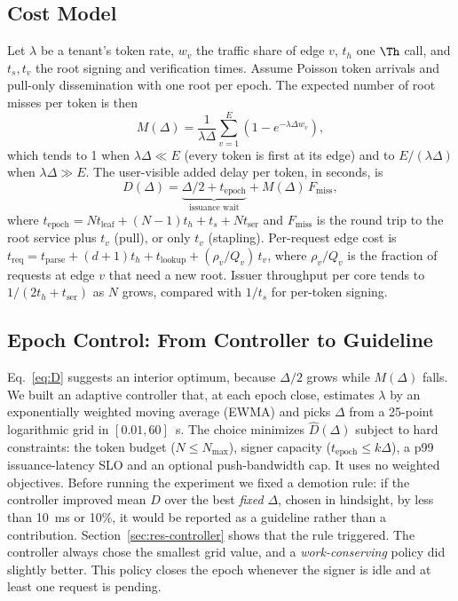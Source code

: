 \subsection{Cost Model}
Let $\lambda$ be a tenant's token rate, $w_v$ the traffic share of edge $v$, $t_h$ one $\Th$ call, and $t_s,t_v$ the root signing and verification times. Assume Poisson token arrivals and pull-only dissemination with one root per epoch. The expected number of root misses per token is then
\begin{equation}
M(\Delta)=\frac{1}{\lambda\Delta}\sum_{v=1}^{E}\left(1-e^{-\lambda\Delta w_v}\right),
\label{eq:miss}
\end{equation}
which tends to 1 when $\lambda\Delta\ll E$ (every token is first at its edge) and to $E/(\lambda\Delta)$ when $\lambda\Delta\gg E$. The user-visible added delay per token, in seconds, is
\begin{equation}
D(\Delta)=\underbrace{\Delta/2+t_{\text{epoch}}}_{\text{issuance wait}}+M(\Delta)\,F_{\text{miss}},
\label{eq:D}
\end{equation}
where $t_{\text{epoch}}=N t_{\text{leaf}}+(N-1)t_h+t_s+N t_{\text{ser}}$ and $F_{\text{miss}}$ is the round trip to the root service plus $t_v$ (pull), or only $t_v$ (stapling). Per-request edge cost is $t_{\text{req}}=t_{\text{parse}}+(d+1)t_h+t_{\text{lookup}}+(\rho_v/Q_v)\,t_v$, where $\rho_v/Q_v$ is the fraction of requests at edge $v$ that need a new root. Issuer throughput per core tends to $1/(2t_h+t_{\text{ser}})$ as $N$ grows, compared with $1/t_s$ for per-token signing.

\subsection{Epoch Control: From Controller to Guideline}
\label{sec:controller}
Eq.~\eqref{eq:D} suggests an interior optimum, because $\Delta/2$ grows while $M(\Delta)$ falls. We built an adaptive controller that, at each epoch close, estimates $\lambda$ by an exponentially weighted moving average (EWMA) and picks $\Delta$ from a 25-point logarithmic grid in $[0.01,60]$~s. The choice minimizes $\hat D(\Delta)$ subject to hard constraints: the token budget ($N\le N_{\max}$), signer capacity ($t_{\text{epoch}}\le k\Delta$), a p99 issuance-latency SLO and an optional push-bandwidth cap. It uses no weighted objectives. Before running the experiment we fixed a demotion rule: if the controller improved mean $D$ over the best \emph{fixed} $\Delta$, chosen in hindsight, by less than 10~ms or 10\%, it would be reported as a guideline rather than a contribution. Section~\ref{sec:res-controller} shows that the rule triggered. The controller always chose the smallest grid value, and a \emph{work-conserving} policy did slightly better. This policy closes the epoch whenever the signer is idle and at least one request is pending.
